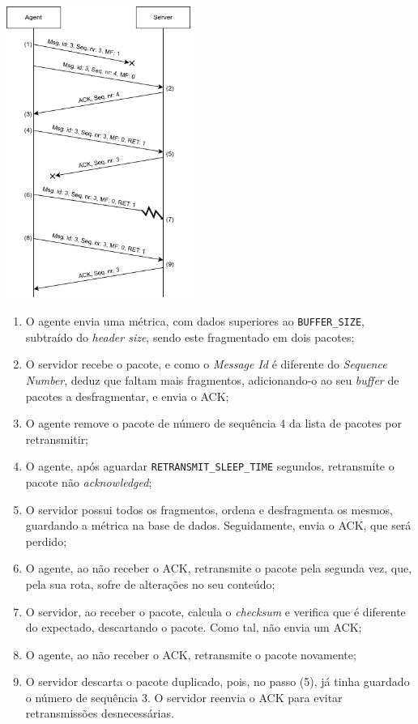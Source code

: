 \documentclass[a4paper,12pt]{scrreprt}
\begin{document}
\begin{minipage}{\textwidth}
    \centering
    \includegraphics[width=0.45\textwidth]{img/sequence_diagrams/ret_dup_frag_ord_error.png}
    \label{fig:nt_ret_dup_frag_ord_error}
\end{minipage}

\begin{enumerate}
    \item O agente envia uma métrica, com dados superiores ao \texttt{BUFFER\_SIZE}, subtraído do \textit{header size},
    sendo este fragmentado em dois pacotes;
    \item O servidor recebe o pacote, e como o \textit{Message Id} é diferente do \textit{Sequence Number}, deduz que
    faltam mais fragmentos, adicionando-o ao seu \textit{buffer} de pacotes a desfragmentar, e envia o ACK;
    \item O agente remove o pacote de número de sequência 4 da lista de pacotes por retransmitir;
    \item O agente, após aguardar \texttt{RETRANSMIT\_SLEEP\_TIME} segundos, retransmite o pacote não \textit{acknowledged};
    \item O servidor possui todos os fragmentos, ordena e desfragmenta os mesmos, guardando a métrica na base de dados.
    Seguidamente, envia o ACK, que será perdido;
    \item O agente, ao não receber o ACK, retransmite o pacote pela segunda vez, que, pela sua rota, sofre de alterações
    no seu conteúdo;
    \item O servidor, ao receber o pacote, calcula o \textit{checksum} e verifica que é diferente do expectado, descartando
    o pacote. Como tal, não envia um ACK;
    \item O agente, ao não receber o ACK, retransmite o pacote novamente;
    \item O servidor descarta o pacote duplicado, pois, no passo (5), já tinha guardado o número de sequência 3.
    O servidor reenvia o ACK para evitar retransmissões desnecessárias.
\end{enumerate}
\end{document}
